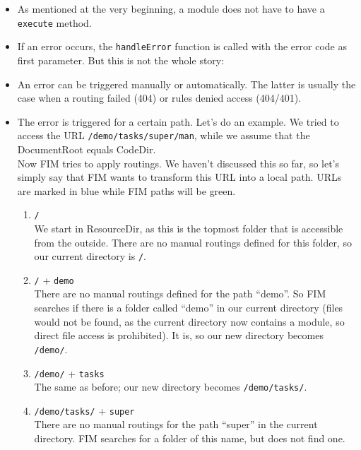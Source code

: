 \documentclass{scrartcl}
\begin{document}
      \begin{itemize}
         \item
            As mentioned at the very beginning, a module does not have to have a \lstinline!execute! method.
         \item
            If an error occurs, the \lstinline!handleError! function is called with the error code as first parameter. But this is not the whole story:
         \item
            An error can be triggered manually or automatically. The latter is usually the case when a routing failed (404) or rules denied access (404/401).
         \item
            The error is triggered for a certain path. Let's do an example. We tried to access the URL \texttt{/demo/tasks/super/man}, while we assume that the DocumentRoot equals CodeDir. \\
            Now FIM tries to apply routings. We haven't discussed this so far, so let's simply say that FIM wants to transform this URL into a local path. URLs are marked in {\color{nbBlue}blue} while FIM paths will be {\color{nbGreen}green}.
            \begin{enumerate}
               \item {\color{nbBlue}\texttt{/}} \\
                  We start in ResourceDir, as this is the topmost folder that is accessible from the outside. There are no manual routings defined for this folder, so our current directory is {\color{nbGreen}\texttt{/}}.
               \item {\color{nbBlue}\texttt{/} + \texttt{demo}} \\
                  There are no manual routings defined for the path ``demo''. So FIM searches if there is a folder called ``demo'' in our current directory (files would not be found, as the current directory now contains a module, so direct file access is prohibited). It is, so our new directory becomes {\color{nbGreen}\texttt{/demo/}}.
               \item {\color{nbBlue}\texttt{/demo/} + \texttt{tasks}} \\
                  The same as before; our new directory becomes {\color{nbGreen}\texttt{/demo/tasks/}}.
               \item {\color{nbBlue}\texttt{/demo/tasks/} + \texttt{super}} \\
                  There are no manual routings for the path ``super'' in the current directory. FIM searches for a folder of this name, but does not find one. \\

\end{enumerate}
\end{itemize}
\end{document}
